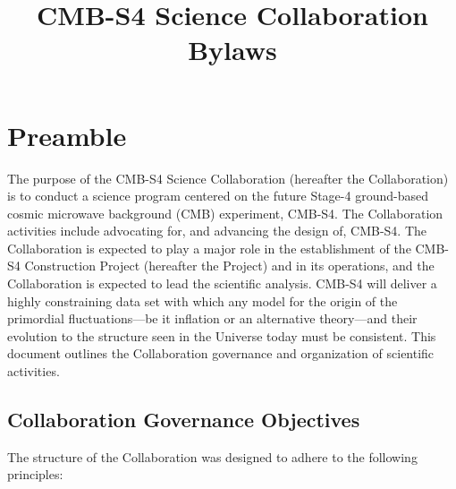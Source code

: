\documentclass[12pt]{article}
\newcommand{\Comment}[1]{\textcolor{Blue}{(Comment: #1)}}
\begin{document}
\title{CMB-S4 Science Collaboration Bylaws}
\maketitle


\tableofcontents


\newpage


\section{Preamble}

The purpose of the CMB-S4 Science Collaboration (hereafter the Collaboration) is to conduct a science program centered on the future Stage-4 ground-based cosmic microwave background (CMB) experiment, CMB-S4. The Collaboration activities include advocating for, and advancing the design of, CMB-S4. The Collaboration is expected to play a major role in the establishment of the CMB-S4 Construction Project (hereafter the Project) and in its operations, and the Collaboration is expected to lead the scientific analysis. 
CMB-S4 will deliver a highly constraining data set with which any model for the origin of the primordial fluctuations---be it inflation or an alternative theory---and their evolution to the structure seen in the Universe today must be consistent. 
This document outlines the Collaboration governance and organization of scientific activities.

\subsection{Collaboration Governance Objectives}
 The structure of the Collaboration was designed to adhere to the following principles:
\end{document}
